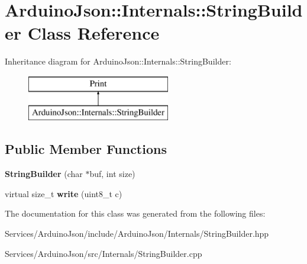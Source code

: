 \hypertarget{class_arduino_json_1_1_internals_1_1_string_builder}{}\section{Arduino\+Json\+:\+:Internals\+:\+:String\+Builder Class Reference}
\label{class_arduino_json_1_1_internals_1_1_string_builder}
Inheritance diagram for Arduino\+Json\+:\+:Internals\+:\+:String\+Builder\+:\begin{figure}[H]
\begin{center}
\leavevmode
\includegraphics[height=2.000000cm]{class_arduino_json_1_1_internals_1_1_string_builder}
\end{center}
\end{figure}
\subsection*{Public Member Functions}
\begin{DoxyCompactItemize}
\item 
\hypertarget{class_arduino_json_1_1_internals_1_1_string_builder_a983e5b4722cdb62b232cce28ff775ac7}{}{\bfseries String\+Builder} (char $\ast$buf, int size)\label{class_arduino_json_1_1_internals_1_1_string_builder_a983e5b4722cdb62b232cce28ff775ac7}

\item 
\hypertarget{class_arduino_json_1_1_internals_1_1_string_builder_a2ce8b059fd24afd6174adb010555603e}{}virtual size\+\_\+t {\bfseries write} (uint8\+\_\+t c)\label{class_arduino_json_1_1_internals_1_1_string_builder_a2ce8b059fd24afd6174adb010555603e}

\end{DoxyCompactItemize}


The documentation for this class was generated from the following files\+:\begin{DoxyCompactItemize}
\item 
Services/\+Arduino\+Json/include/\+Arduino\+Json/\+Internals/String\+Builder.\+hpp\item 
Services/\+Arduino\+Json/src/\+Internals/String\+Builder.\+cpp\end{DoxyCompactItemize}
